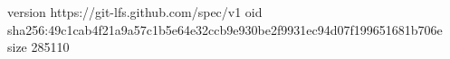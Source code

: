 version https://git-lfs.github.com/spec/v1
oid sha256:49c1cab4f21a9a57c1b5e64e32ccb9e930be2f9931ec94d07f199651681b706e
size 285110
